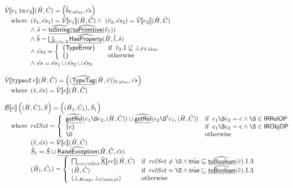 \[\begin{array}{ll}
\aV\lbr e_1\,\TT{in}\,e_2\rbr (\hat{H},\hat{C}) = \left(\hat{b}_{Value},\hat{es}\right)\\
\quad\wherec{
  (\hat{v}_1,\hat{es}_1)=\aV\lbr e_1\rbr(\hat{H},\hat{C})
  \land\ (\hat{v}_2,\hat{es}_2)=\aV\lbr e_2\rbr(\hat{H},\hat{C})\\
  \land\ \hat{s}=\ahf{toString}(\ahf{toPrimitive}(\hat{v}_1)) \\
  \land\ \hat{b} = \bigsqcup_{\hat{l}\in\hat{v}_2.2}\ahf{HasProperty}(\hat{H},\hat{l},\hat{s})\\
  \land\ \hat{es}_3 = \left\{
    \begin{array}{ll}
      \{\hat{\exc{TypeError}}\} & \quad\ifc{\hat{v}_2.1\not\sqsubseteq \bot_{PValue}} \\
      \{\} & \quad\owc \\
    \end{array}
  \right.\\
  \land\ \hat{es} = \hat{es}_1 \sqcup \hat{es}_2 \sqcup \hat{es}_3
}
\\\\

\aV\lbr \TT{typeof}\,e\rbr (\hat{H},\hat{C}) = \left((\ahf{TypeTag}(\hat{H},\hat{v}))_{Value},\hat{es}\right)\\
\quad\wherec{
  (\hat{v},\hat{es}) = \aV\lbr e\rbr(\hat{H},\hat{C})
}
\\\\

\aB \lbr e \rbr \left( (\hat{H},\hat{C}), \hat{S} \right) =  \left( (\hat{H}_1, \hat{C}_1), \hat{S}_1 \right)\\
\quad\wherec{
  relSet = \left\{
    \begin{array}{ll}
      \ahf{getRel}(e_1 \rel e_2, (\hat{H}, \hat{C}))\cup \ahf{getRel}(e_2 \rel^t e_1, (\hat{H}, \hat{C})) & \ifc{ e_1 \rel e_2 = e \land \rel \in \SF{IRRelOP}}\\
      \{ e \} & \ifc{ e_1 \rel e_2 = e \land \rel \in \SF{IRObjOP}}\\
      \O & \owc
    \end{array}
  \right.\\
  (\hat{v}, \hat{es}) = \hat{\V} \lbr e \rbr(\hat{H},\hat{C})\\
  \hat{S}_1 = \hat{S} \sqcup \ahf{RaiseException}(\hat{H}, \hat{C}, \hat{es})\\
  (\hat{H}_1, \hat{C}_1) =
    \left\{
      \begin{array}{ll}
        \bigsqcap_{re \in relSet} \ahf{X} \lbr re \rbr (\hat{H},\hat{C}) & 
          \ifc{ relSet \not= \O \land \hat\vtrue \sqsubseteq \ahf{toBoolean}(\hat{v}).1.3}\\
        (\hat{H}, \hat{C}) & 
          \ifc{ relSet = \O \land \hat\vtrue \sqsubseteq \ahf{toBoolean}(\hat{v}).1.3}\\
         (\bot_{Heap}, \bot_{Context}) & 
          \owc
      \end{array}
    \right.\\
}
\\\\
\end{array}
\]
